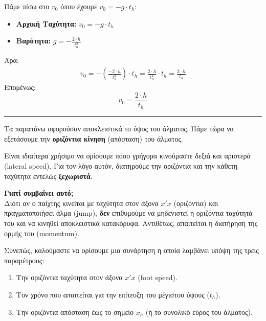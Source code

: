 \documentclass[11pt,a4paper]{article}
\begin{document}
\bigskip
\bigskip
Πάμε πίσω στο $v_0$ όπου έχουμε $v_0 = -g\cdot t_h$:
\begin{itemize}
    \item \textbf{Αρχική Ταχύτητα:} $v_0 = -g\cdot t_h$
    \item \textbf{Βαρύτητα:} $g = -\frac{2\cdot h}{t_h^2}$
\end{itemize}
Άρα:
\begin{align*}
    v_0 = -\left(\frac{-2\cdot h}{t_h^2}\right)\cdot t_h = \frac{2\cdot h}{t_h^2}\cdot t_h = \frac{2\cdot h}{t_h} 
\end{align*}
Επομένως:
\begin{equation*}
    v_0 = \frac{2\cdot h}{t_h} 
\end{equation*}

\vspace{20pt}
\hrule
\vspace{15pt}

Τα παραπάνω αφορούσαν αποκλειστικά το ύψος του άλματος. 
Πάμε τώρα να εξετάσουμε την \textbf{οριζόντια κίνηση} (απόσταση) του άλματος.

\vspace{10pt}
Είναι ιδιαίτερα χρήσιμο να ορίσουμε πόσο γρήγορα κινούμαστε δεξιά και αριστερά (\foreignlanguage{english}{lateral speed}). 
Για τον λόγο αυτόν, διατηρούμε την οριζόντια και την κάθετη ταχύτητα εντελώς \textbf{ξεχωριστά}.

\vspace{5pt}
\noindent\textbf{Γιατί συμβαίνει αυτό;} \\
Διότι αν ο παίχτης κινείται με ταχύτητα στον άξονα $x'x$ (οριζόντια) και πραγματοποιήσει άλμα (\foreignlanguage{english}{jump}), \textbf{δεν} επιθυμούμε να μηδενιστεί η οριζόντια ταχύτητά του και να κινηθεί αποκλειστικά κατακόρυφα. Αντιθέτως, απαιτείται η διατήρηση της ορμής του (\foreignlanguage{english}{momentum}).

\vspace{10pt}
Συνεπώς, καλούμαστε να ορίσουμε μια συνάρτηση η οποία λαμβάνει υπόψη της τρεις παραμέτρους:
\begin{enumerate}
    \item Την οριζόντια ταχύτητα στον άξονα $x'x$ (\foreignlanguage{english}{foot speed}).
    \item Τον χρόνο που απαιτείται για την επίτευξη του μέγιστου ύψους ($t_h$).
    \item Την οριζόντια απόσταση έως το σημείο $x_h$ (ή το συνολικό εύρος του άλματος).
\end{enumerate}
\end{document}
